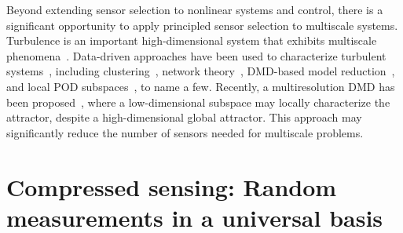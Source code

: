 \documentclass[letterpaper]{IEEEtran}
\begin{document}
%

Beyond extending sensor selection to nonlinear systems and control, there is a significant opportunity to apply principled sensor selection to multiscale systems.  
Turbulence is an important high-dimensional system that exhibits multiscale phenomena~\cite{HLBR_turb,Majda2010dcds,Osth:2014}.  
Data-driven approaches have been used to characterize turbulent systems~\cite{Brunton2015amr}, including clustering~\cite{Kaiser2014jfm}, network theory~\cite{nair2015network,Taira2016jfm}, DMD-based model reduction~\cite{Noack2015arxiv,tissot2014model}, and local POD subspaces~\cite{Amsallem2012ijnme}, to name a few.  
Recently, a multiresolution DMD has been proposed~\cite{Kutz2016siads}, where a low-dimensional subspace may locally characterize the attractor, despite a high-dimensional global attractor.  
This approach may significantly reduce the number of sensors needed for multiscale problems.   
%

\section{Compressed sensing: Random measurements in a universal basis}\label{Sec:Random}
\end{document}
